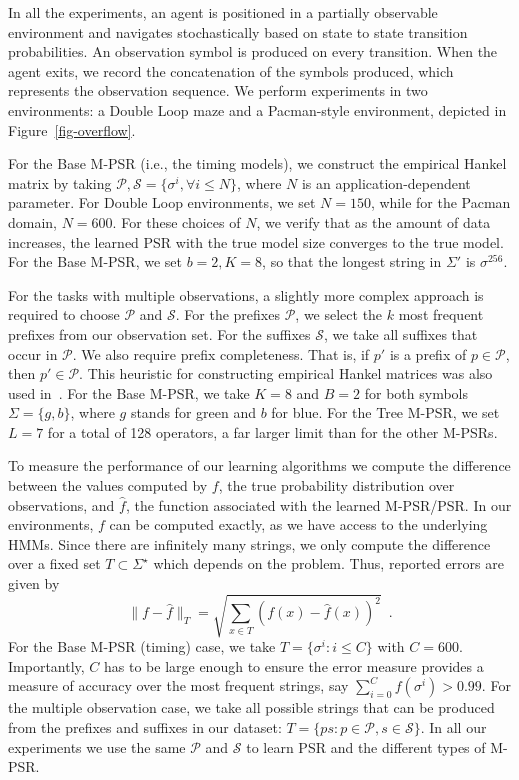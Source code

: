 \documentclass[letterpaper]{article}
\newcommand{\sstar}{\Sigma^\star}
\newcommand{\Ps}{\mathcal{P}}
\newcommand{\Ss}{\mathcal{S}}
\begin{document}
In all the experiments, an agent is positioned in  a partially observable environment and navigates stochastically based on state to state transition probabilities. An observation symbol is produced on every transition. When the agent exits, we record the concatenation of the symbols produced, which represents the observation sequence.  We perform experiments in two environments: a Double Loop maze and a Pacman-style environment, depicted in Figure~\ref{fig-overflow}.

For the Base M-PSR (i.e., the timing models), we construct the empirical Hankel matrix by taking $\Ps, \Ss = \{\sigma^i, \forall i \leq N\}$, where $N$ is an application-dependent parameter. For Double Loop environments, we set $N = 150$, while for the Pacman domain, $N = 600$. For these choices of $N$, we verify that as the amount of data increases, the learned PSR with the true model size converges to the true model. For the Base M-PSR, we set $b=2, K=8$, so that the longest string in $\Sigma'$ is $\sigma^{256}$.

For the tasks with multiple observations, a slightly more complex approach is required to choose $\Ps$ and $\Ss$. For the prefixes $\Ps$, we select the $k$ most frequent prefixes from our observation set. For the suffixes $\Ss$, we take all suffixes that occur in $\Ps$. We also require prefix completeness. That is, if $p'$ is a prefix of $p \in \Ps$, then $p' \in \Ps$. This heuristic for constructing empirical Hankel matrices was also used in~\cite{icml12}. For the Base M-PSR, we take $K=8$ and $B=2$ for both symbols $\Sigma=\{g,b\}$, where $g$ stands for green and $b$ for blue. For the Tree M-PSR, we set $L=7$ for a total of 128 operators, a far larger limit  than for the other M-PSRs. 


To measure the performance of our learning algorithms we compute the difference between the values computed by $f$, the true probability distribution over observations, and $\hat{f}$, the function associated with the learned M-PSR/PSR. In our environments, $f$ can be computed exactly, as we have access to the underlying HMMs. Since there are infinitely many strings, we only compute the difference over a fixed set $T \subset \sstar$ which depends on the problem. Thus, reported errors are given by
\begin{equation*}
\|f - \hat{f}\|_T = \sqrt{\sum_{x \in T}(f(x) - \hat{f}(x))^2} \enspace.
\end{equation*}
For the Base M-PSR (timing) case, we take $T = \{\sigma^i : i \leq C\}$ with $C=600$. Importantly, $C$ has to be  large enough to ensure the error measure provides a measure of accuracy over the most frequent strings, say $\sum_{i=0}^{C} f(\sigma^i)>0.99$. For the multiple observation case, we take all possible strings that can be produced from the prefixes and suffixes in our dataset: $T = \{ps : p \in \Ps, s \in \Ss\}$. In all our experiments we use the same $\Ps$ and $\Ss$ to learn PSR and the different types of M-PSR.
\end{document}
